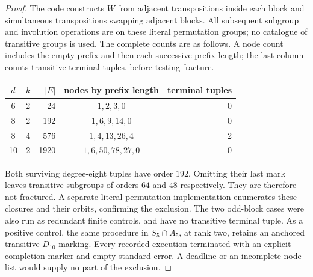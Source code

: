 \documentclass[11pt,a4paper]{article}
\begin{document}
\begin{proof}
The code constructs $W$ from adjacent transpositions inside each block
and simultaneous transpositions swapping adjacent blocks. All subsequent
subgroup and involution operations are on these literal permutation
groups; no catalogue of transitive groups is used. The complete counts
are as follows. A node count includes the empty prefix and then each
successive prefix length; the last column counts transitive terminal
tuples, before testing fracture.
\begin{center}
\begin{tabular}{ccrcr}
\toprule
$d$&$k$&$|E|$&nodes by prefix length&terminal tuples\\
\midrule
6&2&24&$1,2,3,0$&0\\
8&2&192&$1,6,9,14,0$&0\\
8&4&576&$1,4,13,26,4$&2\\
10&2&1920&$1,6,50,78,27,0$&0\\
\bottomrule
\end{tabular}
\end{center}
Both surviving degree-eight tuples have order $192$. Omitting their
last mark leaves transitive subgroups of orders $64$ and $48$
respectively. They are therefore not fractured. A separate literal
permutation implementation enumerates these closures and their orbits,
confirming the exclusion. The two odd-block cases were also run as
redundant finite controls, and have no transitive terminal tuple.
As a positive control, the same procedure in $S_5\cap A_5$, at rank
two, retains an anchored transitive $D_{10}$ marking. Every recorded
execution terminated with an explicit completion marker and empty
standard error. A deadline or an incomplete node list would supply
no part of the exclusion.
\end{proof}
\end{document}
